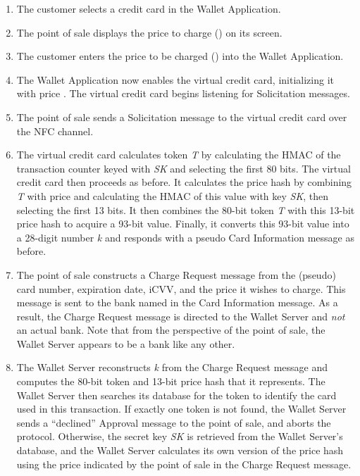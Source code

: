 \begin{enumerate}
\item The customer selects a credit card in the Wallet Application.

\item The point of sale displays the price to charge () on its screen.

\item The customer enters the price to be charged () into the Wallet Application.

\item The Wallet Application now enables the virtual credit card, initializing it with price .
    The virtual credit card begins listening for Solicitation messages.

\item The point of sale sends a Solicitation message to the virtual credit card over the NFC channel.

\item The virtual credit card calculates token \emph{T} by calculating the HMAC of the transaction counter keyed with \emph{SK} and selecting the first 80 bits.
    The virtual credit card then proceeds as before.
    It calculates the price hash by combining \emph{T} with price  and calculating the HMAC of this value with key \emph{SK}, then selecting the first 13 bits.
    It then combines the 80-bit token \emph{T} with this 13-bit price hash to acquire a 93-bit value.
    Finally, it converts this 93-bit value into a 28-digit number \emph{k} and responds with a pseudo Card Information message as before.

\item The point of sale constructs a Charge Request message from the (pseudo) card number, expiration date, iCVV, and the price it wishes to charge.
    This message is sent to the bank named in the Card Information message.
    As a result, the Charge Request message is directed to the Wallet Server and \emph{not} an actual bank.
    Note that from the perspective of the point of sale, the Wallet Server appears to be a bank like any other.

\item The Wallet Server reconstructs \emph{k} from the Charge Request message and computes the 80-bit token and 13-bit price hash that it represents.
    The Wallet Server then searches its database for the token to identify the card used in this transaction.
    If exactly one token is not found, the Wallet Server sends a ``declined'' Approval message to the point of sale, and aborts the protocol.
    Otherwise, the secret key \emph{SK} is retrieved from the Wallet Server's database, and the Wallet Server calculates its own version of the price hash
        using the price indicated by the point of sale in the Charge Request message.


\end{enumerate}
